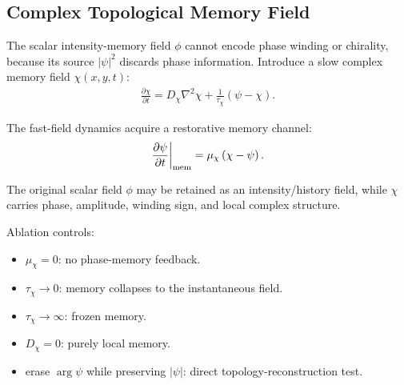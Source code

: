 

\subsection{Complex Topological Memory Field}
The scalar intensity-memory field $\phi$ cannot encode phase winding or chirality,
because its source $|\psi|^2$ discards phase information.  Introduce a slow complex
memory field $\chi(x,y,t)$:
\begin{align}
\frac{\partial \chi}{\partial t}
=
D_{\chi}\nabla^2\chi
+
\frac{1}{\tau_{\chi}}\left(\psi-\chi\right).
\end{align}

The fast-field dynamics acquire a restorative memory channel:
\begin{align}
\frac{\partial \psi}{\partial t}\bigg|_{\rm mem}
=
\mu_{\chi}\left(\chi-\psi\right).
\end{align}

The original scalar field $\phi$ may be retained as an intensity/history field,
while $\chi$ carries phase, amplitude, winding sign, and local complex structure.

Ablation controls:
\begin{itemize}
  \item $\mu_{\chi}=0$: no phase-memory feedback.
  \item $\tau_{\chi}\rightarrow 0$: memory collapses to the instantaneous field.
  \item $\tau_{\chi}\rightarrow \infty$: frozen memory.
  \item $D_{\chi}=0$: purely local memory.
  \item erase $\arg\psi$ while preserving $|\psi|$: direct topology-reconstruction test.
\end{itemize}
